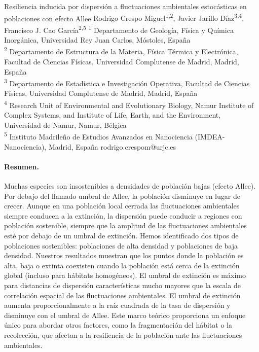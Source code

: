 \documentclass[11pt,a4paper]{article}
\begin{document}

\begin{sincabstract}
{Resiliencia inducida por dispersión a fluctuaciones ambientales estocásticas en poblaciones con efecto Allee}
{Rodrigo Crespo Miguel\textsuperscript{1,2}, Javier Jarillo Díaz\textsuperscript{3,4}, Francisco J. Cao García\textsuperscript{2,5}}
{\textsuperscript{1} Departamento de Geología, Física y Química Inorgánica, Universidad Rey Juan Carlos, Móstoles, España\\
\textsuperscript{2} Departamento de Estructura de la Materia, Física Térmica y Electrónica, Facultad de Ciencias Físicas, Universidad Complutense de Madrid, Madrid, España\\
\textsuperscript{3} Departamento de Estadística e Investigación Operativa, Facultad de Ciencias Físicas, Universidad Complutense de Madrid, Madrid, España\\
\textsuperscript{4} Research Unit of Environmental and Evolutionary Biology, Namur Institute of Complex Systems, and Institute of Life, Earth, and the Environment, Universidad de Namur, Namur, Bélgica\\
\textsuperscript{5} Instituto Madrileño de Estudios Avanzados en Nanociencia (IMDEA-Nanociencia), Madrid, España}
{rodrigo.crespom@urjc.es}

\paragraph{Resumen.}
Muchas especies son insostenibles a densidades de población bajas (efecto Allee). Por debajo del llamado umbral de Allee, la población disminuye en lugar de crecer. Aunque en una población local cerrada las fluctuaciones ambientales siempre conducen a la extinción, la dispersión puede conducir a regiones con población sostenible, siempre que la amplitud de las fluctuaciones ambientales esté por debajo de un umbral de extinción. Hemos identificado dos tipos de poblaciones sostenibles: poblaciones de alta densidad y poblaciones de baja densidad. Nuestros resultados muestran que los puntos donde la población es alta, baja o extinta coexisten cuando la población está cerca de la extinción global (incluso para hábitats homogéneos). El umbral de extinción es máximo para distancias de dispersión características mucho mayores que la escala de correlación espacial de las fluctuaciones ambientales. El umbral de extinción aumenta proporcionalmente a la raíz cuadrada de la tasa de dispersión y disminuye con el umbral de Allee. Este marco teórico proporciona un enfoque único para abordar otros factores, como la fragmentación del hábitat o la recolección, que afectan a la resiliencia de la población ante las fluctuaciones ambientales.


\end{sincabstract}
\end{document}
